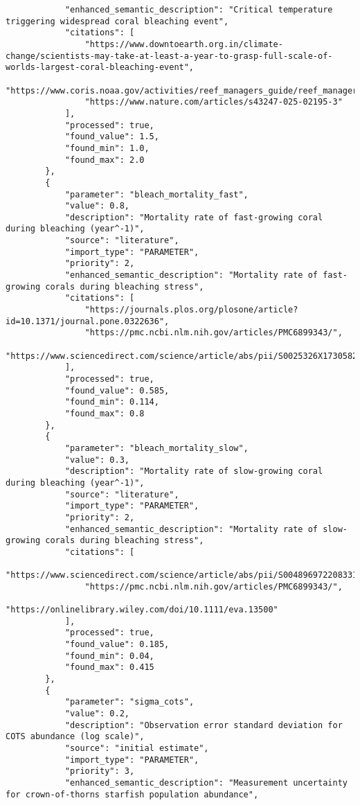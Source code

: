 \begin{lstlisting}
            "enhanced_semantic_description": "Critical temperature triggering widespread coral bleaching event",
            "citations": [
                "https://www.downtoearth.org.in/climate-change/scientists-may-take-at-least-a-year-to-grasp-full-scale-of-worlds-largest-coral-bleaching-event",
                "https://www.coris.noaa.gov/activities/reef_managers_guide/reef_managers_guide_ch4.pdf",
                "https://www.nature.com/articles/s43247-025-02195-3"
            ],
            "processed": true,
            "found_value": 1.5,
            "found_min": 1.0,
            "found_max": 2.0
        },
        {
            "parameter": "bleach_mortality_fast",
            "value": 0.8,
            "description": "Mortality rate of fast-growing coral during bleaching (year^-1)",
            "source": "literature",
            "import_type": "PARAMETER",
            "priority": 2,
            "enhanced_semantic_description": "Mortality rate of fast-growing corals during bleaching stress",
            "citations": [
                "https://journals.plos.org/plosone/article?id=10.1371/journal.pone.0322636",
                "https://pmc.ncbi.nlm.nih.gov/articles/PMC6899343/",
                "https://www.sciencedirect.com/science/article/abs/pii/S0025326X17305829"
            ],
            "processed": true,
            "found_value": 0.585,
            "found_min": 0.114,
            "found_max": 0.8
        },
        {
            "parameter": "bleach_mortality_slow",
            "value": 0.3,
            "description": "Mortality rate of slow-growing coral during bleaching (year^-1)",
            "source": "literature",
            "import_type": "PARAMETER",
            "priority": 2,
            "enhanced_semantic_description": "Mortality rate of slow-growing corals during bleaching stress",
            "citations": [
                "https://www.sciencedirect.com/science/article/abs/pii/S0048969722083310",
                "https://pmc.ncbi.nlm.nih.gov/articles/PMC6899343/",
                "https://onlinelibrary.wiley.com/doi/10.1111/eva.13500"
            ],
            "processed": true,
            "found_value": 0.185,
            "found_min": 0.04,
            "found_max": 0.415
        },
        {
            "parameter": "sigma_cots",
            "value": 0.2,
            "description": "Observation error standard deviation for COTS abundance (log scale)",
            "source": "initial estimate",
            "import_type": "PARAMETER",
            "priority": 3,
            "enhanced_semantic_description": "Measurement uncertainty for crown-of-thorns starfish population abundance",

\end{lstlisting}
